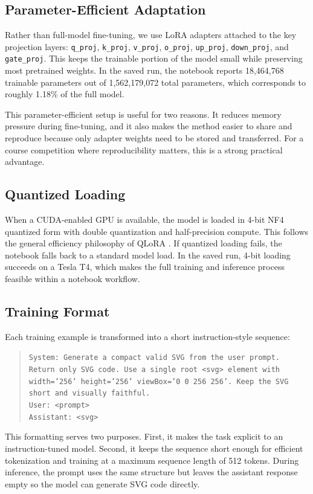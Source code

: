 \documentclass[11pt]{article}
\begin{document}
\subsection{Parameter-Efficient Adaptation}
Rather than full-model fine-tuning, we use LoRA adapters \citep{hu2022lora} attached to the key projection layers:
\texttt{q\_proj}, \texttt{k\_proj}, \texttt{v\_proj}, \texttt{o\_proj}, \texttt{up\_proj}, \texttt{down\_proj}, and \texttt{gate\_proj}. This keeps the trainable portion of the model small while preserving most pretrained weights. In the saved run, the notebook reports 18,464,768 trainable parameters out of 1,562,179,072 total parameters, which corresponds to roughly 1.18\% of the full model.

This parameter-efficient setup is useful for two reasons. It reduces memory pressure during fine-tuning, and it also makes the method easier to share and reproduce because only adapter weights need to be stored and transferred. For a course competition where reproducibility matters, this is a strong practical advantage.

\subsection{Quantized Loading}
When a CUDA-enabled GPU is available, the model is loaded in 4-bit NF4 quantized form with double quantization and half-precision compute. This follows the general efficiency philosophy of QLoRA \citep{dettmers2023qlora}. If quantized loading fails, the notebook falls back to a standard model load. In the saved run, 4-bit loading succeeds on a Tesla T4, which makes the full training and inference process feasible within a notebook workflow.

\subsection{Training Format}
Each training example is transformed into a short instruction-style sequence:
\begin{quote}
\small
\texttt{System: Generate a compact valid SVG from the user prompt. Return only SVG code. Use a single root <svg> element with width='256' height='256' viewBox='0 0 256 256'. Keep the SVG short and visually faithful.}\\
\texttt{User: <prompt>}\\
\texttt{Assistant: <svg>}
\end{quote}

This formatting serves two purposes. First, it makes the task explicit to an instruction-tuned model. Second, it keeps the sequence short enough for efficient tokenization and training at a maximum sequence length of 512 tokens. During inference, the prompt uses the same structure but leaves the assistant response empty so the model can generate SVG code directly.
\end{document}

